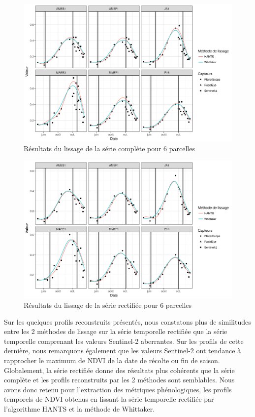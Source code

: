 \begin{figure}[htbp]
 \begin{center}
   \includegraphics[scale=0.7]{materiels_methodes/lissage_prs.png} 
 \end{center}
 \caption{Résultats du lissage de la série complète pour 6 parcelles}
 \label{fig-lissage-prs}
\end{figure}

\begin{figure}[htbp]
 \begin{center}
  \includegraphics[scale=0.7]{materiels_methodes/lissage_prscor.png} 
 \end{center}
 \caption{Résultats du lissage de la série rectifiée pour 6 parcelles}
 \label{fig-lissage-prscor}
\end{figure}

Sur les quelques profils reconstruits présentés, nous constatons plus de similitudes entre les 2 méthodes de lissage sur la série temporelle rectifiée que la série temporelle comprenant les valeurs Sentinel-2 aberrantes. Sur les profils de cette dernière, nous remarquons également que les valeurs Sentinel-2 ont tendance à rapprocher le maximum de NDVI de la date de récolte ou fin de saison. Globalement, la série rectifiée donne des résultats plus cohérents que la série complète et les profils reconstruits par les 2 méthodes sont semblables. Nous avons donc retenu pour l'extraction des métriques phénologiques, les profils temporels de NDVI obtenus en lissant la série temporelle rectifiée par l'algorithme HANTS et la méthode de Whittaker.


